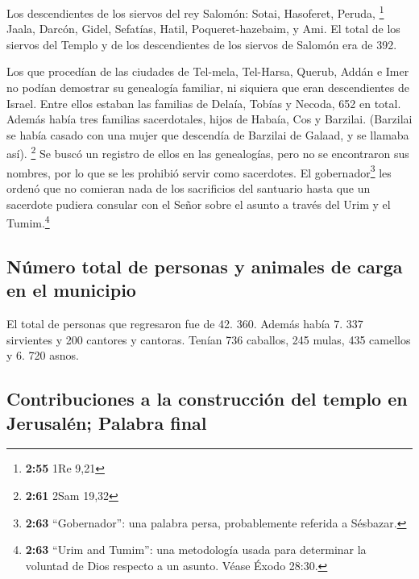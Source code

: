  Los descendientes de los siervos del rey Salomón: Sotai,
Hasoferet, Peruda, \footnote{\textbf{2:55} 1Re 9,21} 
Jaala, Darcón, Gidel,  Sefatías, Hatil,
Poqueret-hazebaim, y Ami.  El total de los siervos del
Templo y de los descendientes de los siervos de Salomón era de 392.

 Los que procedían de las ciudades de Tel-mela,
Tel-Harsa, Querub, Addán e Imer no podían demostrar su genealogía
familiar, ni siquiera que eran descendientes de Israel. 
Entre ellos estaban las familias de Delaía, Tobías y Necoda, 652 en
total.  Además había tres familias sacerdotales, hijos de
Habaía, Cos y Barzilai. (Barzilai se había casado con una mujer que
descendía de Barzilai de Galaad, y se llamaba así). \footnote{\textbf{2:61}
  2Sam 19,32}  Se buscó un registro de ellos en las
genealogías, pero no se encontraron sus nombres, por lo que se les
prohibió servir como sacerdotes.  El
gobernador\footnote{\textbf{2:63} ``Gobernador'': una palabra persa,
  probablemente referida a Sésbazar.} les ordenó que no comieran nada de
los sacrificios del santuario hasta que un sacerdote pudiera consular
con el Señor sobre el asunto a través del Urim y el Tumim.\footnote{\textbf{2:63}
  ``Urim and Tumim'': una metodología usada para determinar la voluntad
  de Dios respecto a un asunto. Véase Éxodo 28:30.}

\hypertarget{nuxfamero-total-de-personas-y-animales-de-carga-en-el-municipio}{%
\subsection{Número total de personas y animales de carga en el
municipio}\label{nuxfamero-total-de-personas-y-animales-de-carga-en-el-municipio}}

 El total de personas que regresaron fue de 42. 360.
 Además había 7. 337 sirvientes y 200 cantores y
cantoras.  Tenían 736 caballos, 245 mulas,
 435 camellos y 6. 720 asnos.

\hypertarget{contribuciones-a-la-construcciuxf3n-del-templo-en-jerusaluxe9n-palabra-final}{%
\subsection{Contribuciones a la construcción del templo en Jerusalén;
Palabra
final}\label{contribuciones-a-la-construcciuxf3n-del-templo-en-jerusaluxe9n-palabra-final}}

